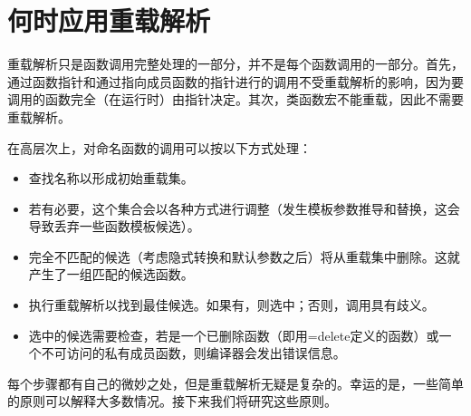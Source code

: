 \section{何时应用重载解析}
重载解析只是函数调用完整处理的一部分，并不是每个函数调用的一部分。首先，通过函数指针和通过指向成员函数的指针进行的调用不受重载解析的影响，因为要调用的函数完全（在运行时）由指针决定。其次，类函数宏不能重载，因此不需要重载解析。

在高层次上，对命名函数的调用可以按以下方式处理：

\begin{itemize}
\item 
查找名称以形成初始重载集。

\item 
若有必要，这个集合会以各种方式进行调整（发生模板参数推导和替换，这会导致丢弃一些函数模板候选）。

\item 
完全不匹配的候选（考虑隐式转换和默认参数之后）将从重载集中删除。这就产生了一组匹配的候选函数。

\item 
执行重载解析以找到最佳候选。如果有，则选中；否则，调用具有歧义。

\item 
选中的候选需要检查，若是一个已删除函数（即用=delete定义的函数）或一个不可访问的私有成员函数，则编译器会发出错误信息。
\end{itemize}

每个步骤都有自己的微妙之处，但是重载解析无疑是复杂的。幸运的是，一些简单的原则可以解释大多数情况。接下来我们将研究这些原则。














































